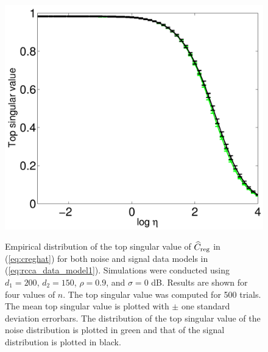 \begin{figure}[h!]
{\includegraphics[width=\figwidth]{figures/rcca_errorbars_low_snr_n_300.pdf} 
} 
\caption{Empirical distribution of the top singular value of $\widehat{C}_{\text{reg}}$ in
  (\ref{eq:creghat}) for both noise and signal data models in
  (\ref{eq:rcca_data_model1}). Simulations were conducted using $d_1=200$, $d_2=150$,
  $\rho=0.9$, and $\sigma=0$ dB. Results are shown for four values of $n$. The top
  singular value was computed for 500 trials. The mean top singular value is plotted with
  $\pm$ one standard deviation errorbars. The distribution of the top singular value of the
  noise distribution is plotted in green and that of the signal distribution is plotted in
  black.}
\label{fig:rcca_errorbars_low_snr}
\end{figure}

